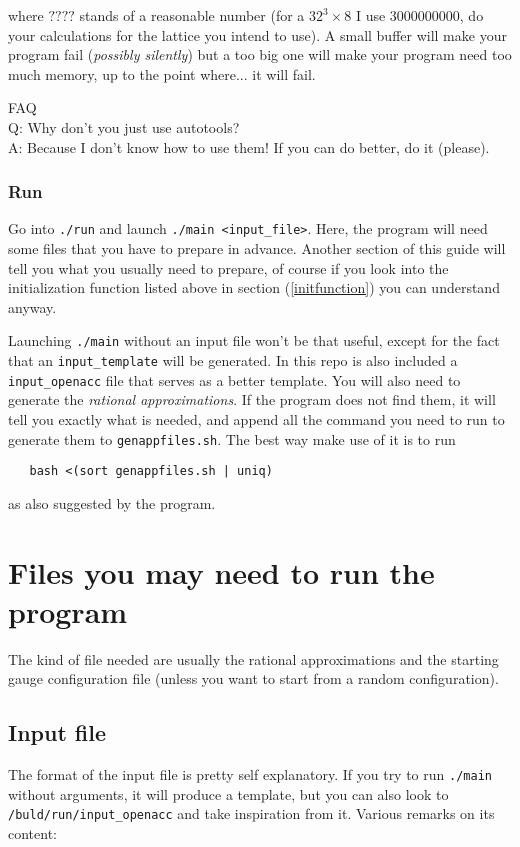 \documentclass[a4paper,10pt]{book}
\begin{document}
  where $????$ stands of a reasonable number (for a $32^3\times8$ I use
  3000000000, do your calculations for the lattice you intend to use).
  A small buffer will make your program fail (\emph{possibly silently}) but a 
too big one will make your program need too much memory, up to the point 
where... it will fail.

 
  FAQ \\
  Q: Why don't you just use autotools? \\
  A: Because I don't know how to use them! If you can do better, do
     it (please).

  \subsubsection{Run}
  Go into \verb|./run| and launch \verb|./main <input_file>|. Here, the program 
  will  need some  files that you have to prepare in advance. Another section
  of this  guide will tell you what you usually need to prepare, of
  course if  you look into the initialization function listed above in
  section (\ref{initfunction}) you can understand anyway.
  
  Launching \verb|./main| without an input file won't be that useful,
  except for the fact that an \verb|input_template| will be generated.
  In this repo is also included a \verb|input_openacc| file that serves as
  a better template.
  You will also need to generate the \emph{rational approximations}. If the
  program does not find them, it will tell you exactly what is needed, 
  and append all the command
  you need to run to generate them to \verb|genappfiles.sh|. The best way make 
  use of it is to run
  \begin{verbatim}
   bash <(sort genappfiles.sh | uniq)
  \end{verbatim}
  as also suggested by the program. 

\section{Files you may need to run the program}
  The kind of file needed are usually the rational approximations and
  the starting gauge configuration file (unless you want to start from
  a random configuration).

 \subsection{Input file}
  The format of the input file is pretty self explanatory. If you try
  to run \verb|./main| without arguments, it will produce a template, but
  you can also look to \verb|/buld/run/input_openacc| and take inspiration from 
  it. Various remarks on its content:
 
\end{document}

